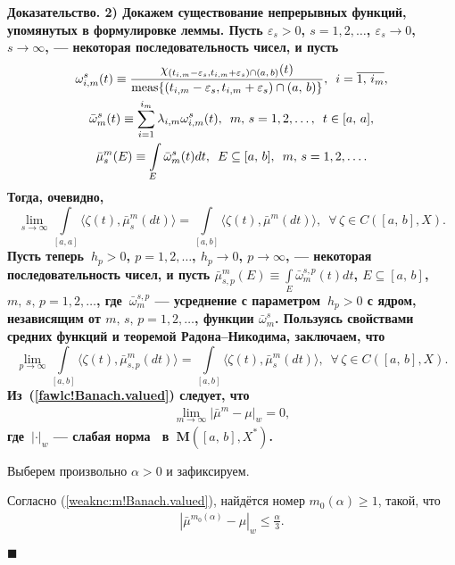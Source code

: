 \documentclass{report}
\newenvironment{Proof}{\par\noindent\bf Доказательство.\rm}{ $\blacksquare$\par}
\newcommand{\meas}{\mathop{\rm meas}\nolimits}
\begin{document}
\begin{Proof}
2) Докажем существование непрерывных функций, упомянутых в формулировке леммы. Пусть $\varepsilon_s>0$, $s=1,2,\dots$, $\varepsilon_s\to0$, $s\to\infty$, --- некоторая последовательность
чисел, и пусть
\begin{gather*}
\omega^s_{i,m}(t)\equiv \frac{\chi_{(t_{i,m}-\varepsilon_s,t_{i,m}+\varepsilon_s)\cap(a,\,b)}(t)}{\meas\{(t_{i,m}-\varepsilon_s,t_{i,m}+\varepsilon_s)\cap(a,\,b)\}},\,\,\,
i=\overline{1,\,i_m},\\
\bar{\omega}^s_m(t)\equiv\sum\limits_{i=1}^{i_m}\lambda_{i,m}\omega^s_{i,m}(t),\,\,\,m,\,s=1,2,\dots,\,\,\,t\in[a,\,a],\\
\bar{\mu}_s^m(E)\equiv\int\limits_E\bar{\omega}^s_m(t)dt,\,\,\, E\subseteq[a,\,b],\,\,\,m,\,s=1,2,\dots.
\end{gather*}
Тогда, очевидно,
\begin{equation}\label{sawlc!Banach.valued}
\lim\limits_{s\to\infty}\int\limits_{[a,a]}\langle\zeta(t),\bar{\mu}^m_s(dt)\rangle= \int\limits_{[a,b]}\langle\zeta(t),\bar{\mu}^m(dt)\rangle,\,\,\,\forall\,\zeta\in C([a,\,b],X).
\end{equation}
Пусть теперь~$h_p>0$, $p=1,2,\dots$, $h_p\to0$, $p\to\infty$, --- некоторая последовательность чисел, и пусть $\displaystyle\bar{\mu}^m_{s,p}(E)\equiv \int\limits_E\bar{\omega}^{s,p}_m(t)
dt$, $E\subseteq[a,\,b]$, $m,\,s,\,p=1,2,\dots$, где~$\bar{\omega}^{s,p}_m$ --- усреднение с параметром~$h_p>0$ с ядром, независящим от $m,\,s,\,p=1,2,\dots$, функции $\bar{\omega}^{s}_m$.
Пользуясь свойствами средних функций и теоремой Радона--Никодима, заключаем, что
\begin{equation}\label{tawlc!Banach.valued}
\lim\limits_{p\to\infty}\int\limits_{[a,b]}\langle\zeta(t),\bar{\mu}^m_{s,p}(dt)\rangle= \int\limits_{[a,b]}\langle\zeta(t),\bar{\mu}^m_s(dt)\rangle,\,\,\,\forall\,\zeta\in C([a,\,b],X).
\end{equation}
Из~(\ref{fawlc!Banach.valued}) следует, что
\begin{gather}\label{weaknc:m!Banach.valued}
\lim\limits_{m\to\infty}|\bar{\mu}^m-\mu|_w=0,
\end{gather}
где~$|\cdot|_w$ --- слабая норма~\cite{warga} в~$\mathbf{M}([a,\,b],X^*)$.

Выберем произвольно $\alpha>0$ и зафиксируем.

Согласно (\ref{weaknc:m!Banach.valued}), найдётся номер $m_0(\alpha)\geqslant1$, такой, что
\begin{gather*}
|\bar{\mu}^{m_0(\alpha)}-\mu|_w\leqslant\frac\alpha3.
\end{gather*}


\end{Proof}
\end{document}
